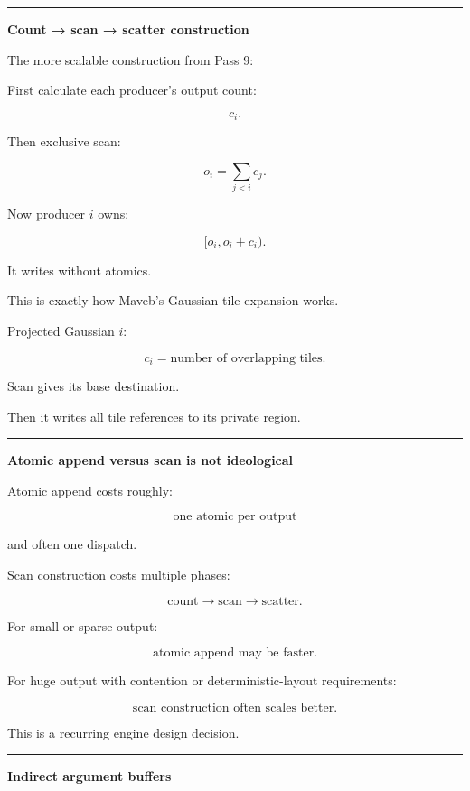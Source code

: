 \begin{center}\rule{0.5\linewidth}{0.5pt}\end{center}

\textbf{Count → scan → scatter construction}

The more scalable construction from Pass 9:

First calculate each producer's output count:

\[
c_i.
\]

Then exclusive scan:

\[
o_i=
\sum_{j<i}c_j.
\]

Now producer \(i\) owns:

\[
[o_i,o_i+c_i).
\]

It writes without atomics.

This is exactly how Maveb's Gaussian tile expansion works.

Projected Gaussian \(i\):

\[
c_i=
\text{number of overlapping tiles}.
\]

Scan gives its base destination.

Then it writes all tile references to its private region.

\begin{center}\rule{0.5\linewidth}{0.5pt}\end{center}

\textbf{Atomic append versus scan is not ideological}

Atomic append costs roughly:

\[
\text{one atomic per output}
\]

and often one dispatch.

Scan construction costs multiple phases:

\[
\text{count}
\rightarrow
\text{scan}
\rightarrow
\text{scatter}.
\]

For small or sparse output:

\[
\boxed{
\text{atomic append may be faster}.
}
\]

For huge output with contention or deterministic-layout requirements:

\[
\boxed{
\text{scan construction often scales better}.
}
\]

This is a recurring engine design decision.

\begin{center}\rule{0.5\linewidth}{0.5pt}\end{center}

\textbf{Indirect argument buffers}

